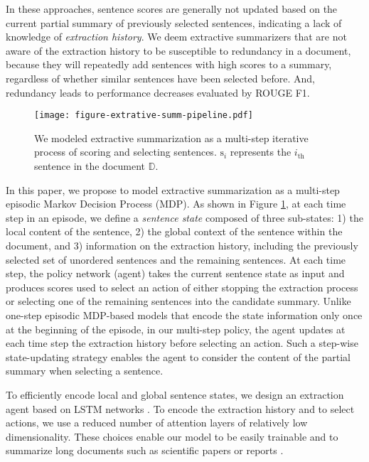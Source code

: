 \documentclass[11pt]{article}
\begin{document}
In these approaches, sentence scores are generally not updated based on the current partial summary of previously selected sentences, indicating a lack of knowledge of \textit{extraction history}. We deem extractive summarizers that are not aware of the extraction history to be susceptible to redundancy in a document, because they will repeatedly add sentences with high scores to a summary, regardless of whether similar sentences have been selected before. And, redundancy leads to performance decreases evaluated by ROUGE F1.

\begin{figure}
\centering
  \texttt{[image: figure-extrative-summ-pipeline.pdf]}
  \caption{We modeled extractive summarization as a multi-step iterative process of scoring and selecting sentences. $\text{s}_i$ represents the $i_\text{th}$ sentence in the document $\mathbb{D}$.}
  \label{fig:extractive_summ_pipeline}
\end{figure}


In this paper, we propose to model extractive summarization as a multi-step episodic Markov Decision Process (MDP). As shown in Figure \ref{fig:extractive_summ_pipeline}, at each time step in an episode, we define a \textit{sentence state} composed of three sub-states: 1) the local content of the sentence, 2) the global context of the sentence within the document, and 3) information on the extraction history, including the previously selected set of unordered sentences and the remaining sentences. At each time step, the policy network (agent) takes the current sentence state as input and produces scores used to select an action of either stopping the extraction process or selecting one of the remaining sentences into the candidate summary. Unlike one-step episodic MDP-based models \cite{narayan2018ranking,dong2018banditsum, luo2019reading} that encode the state information only once at the beginning of the episode, in our multi-step policy, the agent updates at each time step the extraction history before selecting an action. Such a step-wise state-updating strategy enables the agent to consider the content of the partial summary when selecting a sentence. 

To efficiently encode local and global sentence states, we design an extraction agent based on LSTM networks \cite{hochreiter1997long}. To encode the extraction history and to select actions, we use a reduced number of attention layers \cite{vaswani2017attention} of relatively low dimensionality. These choices enable our model to be easily trainable and to summarize long documents such as scientific papers \cite{cohan2018discourse,huang2021efficient} or reports \cite{huang2021efficient}.
\end{document}
